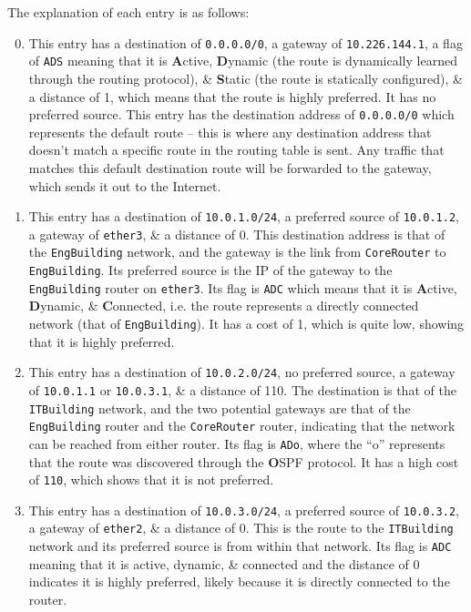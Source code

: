 \documentclass[a4paper]{article}
\begin{document}
The explanation of each entry is as follows:
\begin{enumerate}
\setcounter{enumi}{-1} 
    \item   This entry has a destination of \verb|0.0.0.0/0|, a gateway of \verb|10.226.144.1|, a flag of \verb|ADS| meaning 
            that it is \textbf{A}ctive, \textbf{D}ynamic (the route is dynamically learned through the routing protocol), \& 
            \textbf{S}tatic (the route is statically configured), \& a distance of 1, which means that the route is highly preferred.
            It has no preferred source.
            This entry has the destination address of \verb|0.0.0.0/0| which represents the default route -- this is where any 
            destination address that doesn't match a specific route in the routing table is sent.
            Any traffic that matches this default destination route will be forwarded to the gateway, which sends it out to
            the Internet.

    \item   This entry has a destination of \verb|10.0.1.0/24|, a preferred source of \verb|10.0.1.2|, a gateway of 
            \verb|ether3|, \& a distance of 0. 
            This destination address is that of the \verb|EngBuilding| network, and the gateway is the link from 
            \verb|CoreRouter| to \verb|EngBuilding|. 
            Its preferred source is the IP of the gateway to the \verb|EngBuilding| router on \verb|ether3|.
            Its flag is \verb|ADC| which means that it is \textbf{A}ctive, \textbf{D}ynamic, \& \textbf{C}onnected, i.e. 
            the route represents a directly connected network (that of \verb|EngBuilding|).
            It has a cost of 1, which is quite low, showing that it is highly preferred.

    \item   This entry has a destination of \verb|10.0.2.0/24|, no preferred source, a gateway of 
            \verb|10.0.1.1| or \verb|10.0.3.1|, \& a distance of 110. 
            The destination is that of the \verb|ITBuilding| network, and the two potential gateways are that of the 
            \verb|EngBuilding| router and the \verb|CoreRouter| router, indicating that the network can be reached from 
            either router.
            Its flag is \verb|ADo|, where the ``o'' represents that the route was discovered through the \textbf{O}SPF 
            protocol.
            It has a high cost of \verb|110|, which shows that it is not preferred.

    \item   This entry has a destination of \verb|10.0.3.0/24|, a preferred source of \verb|10.0.3.2|, a gateway of 
            \verb|ether2|, \& a distance of 0. 
            This is the route to the \verb|ITBuilding| network and its preferred source is from within that network.
            Its flag is \verb|ADC| meaning that it is active, dynamic, \& connected and the distance of 0 indicates it is 
            highly preferred, likely because it is directly connected to the router.


\end{enumerate}
\end{document}
